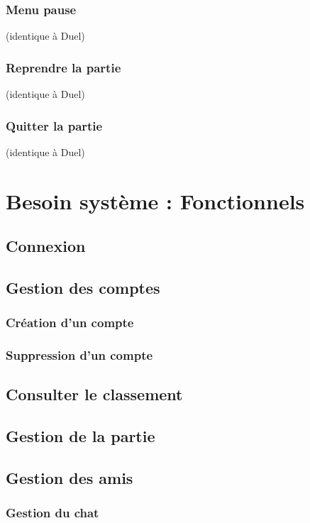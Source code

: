 \documentclass{article}
\begin{document}
\subsubsection*{Menu pause} (identique à Duel)
\subsubsection*{Reprendre la partie} (identique à Duel)
\subsubsection*{Quitter la partie} (identique à Duel)

\section{Besoin système : Fonctionnels}

\subsection{Connexion}

\subsection{Gestion des comptes}

\subsubsection{Création d'un compte}

\subsubsection{Suppression d'un compte}

\subsection{Consulter le classement}

\subsection{Gestion de la partie}

\subsection{Gestion des amis}

\subsubsection{Gestion du chat}
\end{document}
